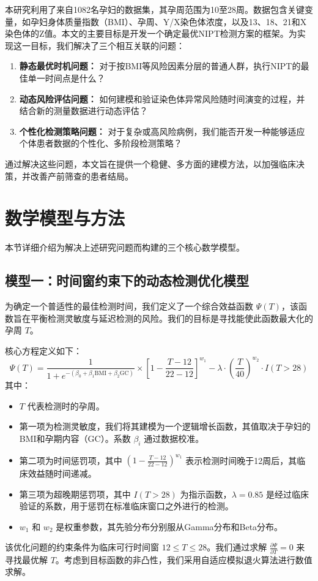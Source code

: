 \documentclass[UTF8, a4paper, 11pt]{ctexart}
\begin{document}
本研究利用了来自1082名孕妇的数据集，其孕周范围为10至28周。数据包含关键变量，如孕妇身体质量指数（BMI）、孕周、Y/X染色体浓度，以及13、18、21和X染色体的Z值。本文的主要目标是开发一个确定最优NIPT检测方案的框架。为实现这一目标，我们解决了三个相互关联的问题：
\begin{enumerate}
    \item \textbf{静态最优时机问题：} 对于按BMI等风险因素分层的普通人群，执行NIPT的最佳单一时间点是什么？
    \item \textbf{动态风险评估问题：} 如何建模和验证染色体异常风险随时间演变的过程，并结合新的测量数据进行动态评估？
    \item \textbf{个性化检测策略问题：} 对于复杂或高风险病例，我们能否开发一种能够适应个体患者数据的个性化、多阶段检测策略？
\end{enumerate}
通过解决这些问题，本文旨在提供一个稳健、多方面的建模方法，以加强临床决策，并改善产前筛查的患者结局。

\section{数学模型与方法}
本节详细介绍为解决上述研究问题而构建的三个核心数学模型。

\subsection{模型一：时间窗约束下的动态检测优化模型}
为确定一个普适性的最佳检测时间，我们定义了一个综合效益函数 $\Psi(T)$，该函数旨在平衡检测灵敏度与延迟检测的风险。我们的目标是寻找能使此函数最大化的孕周 $T$。

核心方程定义如下：
\begin{equation}
\Psi(T) = \frac{1}{1 + e^{-(\beta_0 + \beta_1 \text{BMI} + \beta_2 \text{GC})}} \times \left[1 - \frac{T - 12}{22 - 12}\right]^{w_1} - \lambda \cdot \left(\frac{T}{40}\right)^{w_2} \cdot I(T > 28)
\end{equation}
其中：
\begin{itemize}
    \item $T$ 代表检测时的孕周。
    \item 第一项为检测灵敏度，我们将其建模为一个逻辑增长函数，其值取决于孕妇的BMI和孕期内容（GC）。系数 $\beta_i$ 通过数据校准。
    \item 第二项为时间惩罚项，其中 $(1 - \frac{T - 12}{22 - 12})^{w_1}$ 表示检测时间晚于12周后，其临床效益随时间递减。
    \item 第三项为超晚期惩罚项，其中 $I(T > 28)$ 为指示函数，$\lambda=0.85$ 是经过临床验证的系数，用于惩罚在标准临床窗口之外进行的检测。
    \item $w_1$ 和 $w_2$ 是权重参数，其先验分布分别服从Gamma分布和Beta分布。
\end{itemize}
该优化问题的约束条件为临床可行时间窗 $12 \leq T \leq 28$。我们通过求解 $\frac{\partial \Psi}{\partial T} = 0$ 来寻找最优解 $T$。考虑到目标函数的非凸性，我们采用自适应模拟退火算法进行数值求解。
\end{document}
